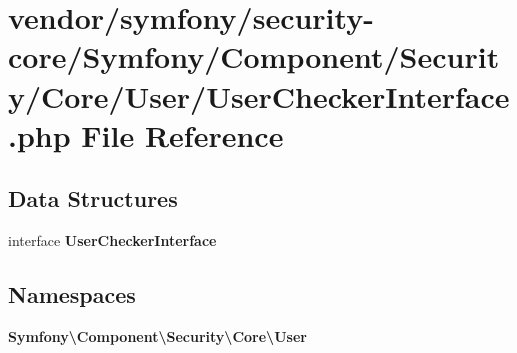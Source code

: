 \section{vendor/symfony/security-\/core/\+Symfony/\+Component/\+Security/\+Core/\+User/\+User\+Checker\+Interface.php File Reference}
\label{_user_checker_interface_8php}
\subsection*{Data Structures}
\begin{DoxyCompactItemize}
\item 
interface {\bf User\+Checker\+Interface}
\end{DoxyCompactItemize}
\subsection*{Namespaces}
\begin{DoxyCompactItemize}
\item 
 {\bf Symfony\textbackslash{}\+Component\textbackslash{}\+Security\textbackslash{}\+Core\textbackslash{}\+User}
\end{DoxyCompactItemize}
